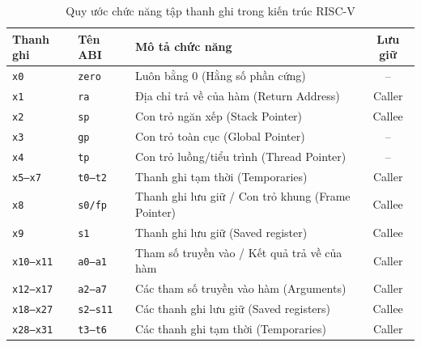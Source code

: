 \begin{table}[H]
\centering
\small
\begin{tabularx}{\textwidth}{l l X c}
\toprule
\textbf{Thanh ghi} & \textbf{Tên ABI} & \textbf{Mô tả chức năng} & \textbf{Lưu giữ} \\
\midrule
\texttt{x0} & \texttt{zero} & Luôn bằng 0 (Hằng số phần cứng) & -- \\
\texttt{x1} & \texttt{ra} & Địa chỉ trả về của hàm (Return Address) & Caller \\
\texttt{x2} & \texttt{sp} & Con trỏ ngăn xếp (Stack Pointer) & Callee \\
\texttt{x3} & \texttt{gp} & Con trỏ toàn cục (Global Pointer) & -- \\
\texttt{x4} & \texttt{tp} & Con trỏ luồng/tiểu trình (Thread Pointer) & -- \\
\texttt{x5--x7} & \texttt{t0--t2} & Thanh ghi tạm thời (Temporaries) & Caller \\
\texttt{x8} & \texttt{s0/fp} & Thanh ghi lưu giữ / Con trỏ khung (Frame Pointer) & Callee \\
\texttt{x9} & \texttt{s1} & Thanh ghi lưu giữ (Saved register) & Callee \\
\texttt{x10--x11} & \texttt{a0--a1} & Tham số truyền vào / Kết quả trả về của hàm & Caller \\
\texttt{x12--x17} & \texttt{a2--a7} & Các tham số truyền vào hàm (Arguments) & Caller \\
\texttt{x18--x27} & \texttt{s2--s11} & Các thanh ghi lưu giữ (Saved registers) & Callee \\
\texttt{x28--x31} & \texttt{t3--t6} & Các thanh ghi tạm thời (Temporaries) & Caller \\
\bottomrule
\end{tabularx}
\caption{Quy ước chức năng tập thanh ghi trong kiến trúc RISC-V}
\label{tab:registers}
\end{table}

